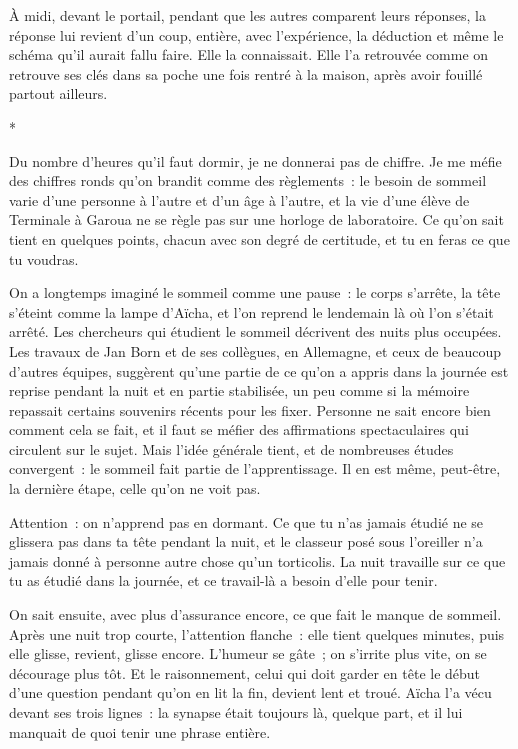\documentclass[10.5pt,twoside,openright]{book}
\newcommand{\asterisme}{\par\vspace{0.7em}\centerline{\color{gris}*\quad*\quad*}\vspace{0.7em}\par\noindent}
\begin{document}
À midi, devant le portail, pendant que les autres comparent leurs réponses, la réponse lui revient d’un coup, entière, avec l’expérience, la déduction et même le schéma qu’il aurait fallu faire. Elle la connaissait. Elle l’a retrouvée comme on retrouve ses clés dans sa poche une fois rentré à la maison, après avoir fouillé partout ailleurs.

\asterisme

Du nombre d’heures qu’il faut dormir, je ne donnerai pas de chiffre. Je me méfie des chiffres ronds qu’on brandit comme des règlements : le besoin de sommeil varie d’une personne à l’autre et d’un âge à l’autre, et la vie d’une élève de Terminale à Garoua ne se règle pas sur une horloge de laboratoire. Ce qu’on sait tient en quelques points, chacun avec son degré de certitude, et tu en feras ce que tu voudras.

On a longtemps imaginé le sommeil comme une pause : le corps s’arrête, la tête s’éteint comme la lampe d’Aïcha, et l’on reprend le lendemain là où l’on s’était arrêté. Les chercheurs qui étudient le sommeil décrivent des nuits plus occupées. Les travaux de Jan Born et de ses collègues, en Allemagne, et ceux de beaucoup d’autres équipes, suggèrent qu’une partie de ce qu’on a appris dans la journée est reprise pendant la nuit et en partie stabilisée, un peu comme si la mémoire repassait certains souvenirs récents pour les fixer. Personne ne sait encore bien comment cela se fait, et il faut se méfier des affirmations spectaculaires qui circulent sur le sujet. Mais l’idée générale tient, et de nombreuses études convergent : le sommeil fait partie de l’apprentissage. Il en est même, peut-être, la dernière étape, celle qu’on ne voit pas.

Attention : on n’apprend pas en dormant. Ce que tu n’as jamais étudié ne se glissera pas dans ta tête pendant la nuit, et le classeur posé sous l’oreiller n’a jamais donné à personne autre chose qu’un torticolis. La nuit travaille sur ce que tu as étudié dans la journée, et ce travail-là a besoin d’elle pour tenir.

On sait ensuite, avec plus d’assurance encore, ce que fait le manque de sommeil. Après une nuit trop courte, l’attention flanche : elle tient quelques minutes, puis elle glisse, revient, glisse encore. L’humeur se gâte ; on s’irrite plus vite, on se décourage plus tôt. Et le raisonnement, celui qui doit garder en tête le début d’une question pendant qu’on en lit la fin, devient lent et troué. Aïcha l’a vécu devant ses trois lignes : la synapse était toujours là, quelque part, et il lui manquait de quoi tenir une phrase entière.
\end{document}
